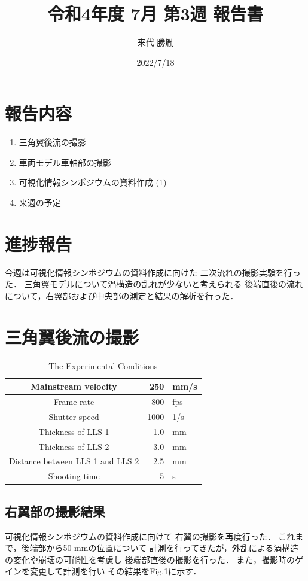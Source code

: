 \documentclass[twocolumn,a4j]{jsarticle}
\author{来代 勝胤}
\title{令和4年度 7月 第3週 報告書}
\date{2022/7/18}
\begin{document}
\columnseprule=0.1mm
\maketitle

\section*{報告内容}
\begin{enumerate}[1.]
  \item 三角翼後流の撮影
  \item 車両モデル車軸部の撮影
  \item 可視化情報シンポジウムの資料作成 (1)
  \item 来週の予定
\end{enumerate}

\section*{進捗報告}
今週は可視化情報シンポジウムの資料作成に向けた
二次流れの撮影実験を行った．
三角翼モデルについて渦構造の乱れが少ないと考えられる
後端直後の流れについて，右翼部および中央部の測定と結果の解析を行った．

\section{三角翼後流の撮影}
\begin{table}[hbtp]
  \centering
  \caption{The Experimental Conditions}
  \begin{tabular}{ c r l }
    \hline
    Mainstream velocity              & 250  & mm/s \\ \hline
    Frame rate                       & 800  & fps  \\ \hline
    Shutter speed                    & 1000 & 1/s  \\ \hline
    Thickness of LLS 1               & 1.0  & mm   \\ \hline
    Thickness of LLS 2               & 3.0  & mm   \\ \hline
    Distance between LLS 1 and LLS 2 & 2.5  & mm   \\ \hline
    Shooting time                    & 5    & s    \\ \hline
  \end{tabular}
\end{table}

\subsection{右翼部の撮影結果}
可視化情報シンポジウムの資料作成に向けて
右翼の撮影を再度行った．
これまで，後端部から50 mmの位置について
計測を行ってきたが，外乱による渦構造の変化や崩壊の可能性を考慮し
後端部直後の撮影を行った．
また，撮影時のゲインを変更して計測を行い
その結果をFig.1に示す．\\
\end{document}
